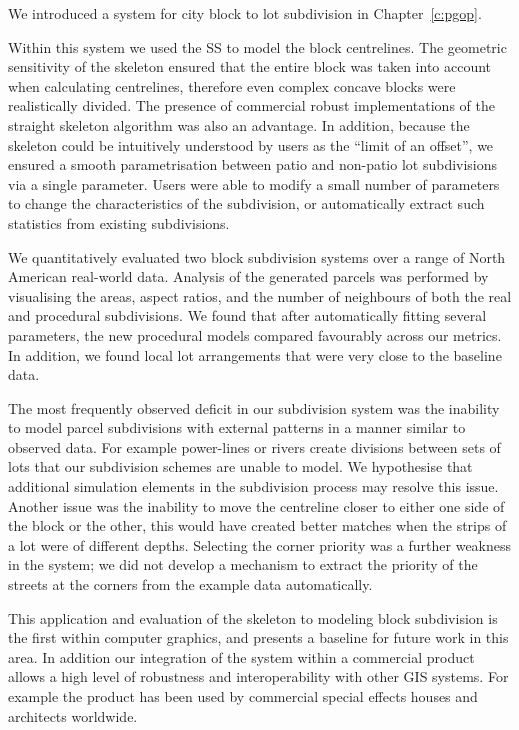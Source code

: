 We introduced a system for city block to lot subdivision in Chapter~\ref{c:pgop}. 

Within this system we used the SS to model the block centrelines. The geometric sensitivity of the skeleton ensured that the entire block was taken into account when calculating centrelines, therefore even complex concave blocks were realistically divided. The presence of commercial robust implementations of the straight skeleton algorithm was also an advantage. In addition, because the skeleton could be intuitively understood by users as the ``limit of an offset'', we ensured a smooth parametrisation between patio and non-patio lot subdivisions via a single parameter. Users were able to modify a small number of parameters to change the characteristics of the subdivision, or automatically extract such statistics from existing subdivisions. 

We  quantitatively evaluated two block subdivision systems over a range of North American real-world data. Analysis of the generated parcels was performed by visualising the areas, aspect ratios, and the number of neighbours of both the real and procedural subdivisions. We found that after automatically fitting several parameters, the new procedural models compared favourably across our metrics. In addition, we found local lot arrangements that were very close to the baseline data.

The most frequently observed deficit in our subdivision system was the inability to model parcel subdivisions with external patterns in a manner similar to observed data. For example power-lines or rivers create divisions between sets of lots that our subdivision schemes are unable to model. We hypothesise that additional simulation elements in the subdivision process may resolve this issue. Another issue was the inability to move the centreline closer to either one side of the block or the other, this would have created better matches when the strips of a lot were of different depths. Selecting the corner priority was a further weakness in the system; we did not develop a mechanism to extract the priority of the streets at the corners from the example data automatically.

This application and evaluation of the skeleton to modeling block subdivision is the first within computer graphics, and presents a baseline for future work in this area. In addition our integration of the system within a commercial product allows a high level of robustness and interoperability with other GIS systems. For example the product has been used by commercial special effects houses and architects worldwide.

